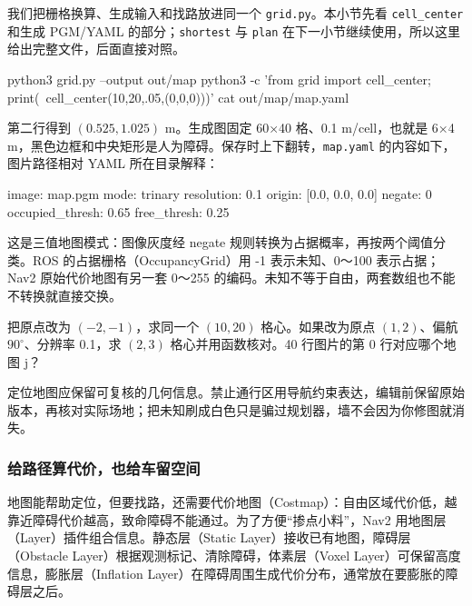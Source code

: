 \begin{example}\label{ex:nav-grid-project}
我们把栅格换算、生成输入和找路放进同一个 \texttt{grid.py}。本小节先看 \texttt{cell\_center} 和生成 PGM/YAML 的部分；\texttt{shortest} 与 \texttt{plan} 在下一小节继续使用，所以这里给出完整文件，后面直接对照。


\begin{tbash}
python3 grid.py --output out/map
python3 -c 'from grid import cell_center; print(\
cell_center(10,20,.05,(0,0,0)))'
cat out/map/map.yaml
\end{tbash}
第二行得到 $(0.525,1.025)$ m。生成图固定 60×40 格、0.1 m/cell，也就是 6×4 m，黑色边框和中央矩形是人为障碍。保存时上下翻转，\texttt{map.yaml} 的内容如下，图片路径相对 YAML 所在目录解释：
\begin{tbash}
image: map.pgm
mode: trinary
resolution: 0.1
origin: [0.0, 0.0, 0.0]
negate: 0
occupied_thresh: 0.65
free_thresh: 0.25
\end{tbash}
这是三值地图模式：图像灰度经 negate 规则转换为占据概率，再按两个阈值分类。ROS 的占据栅格（OccupancyGrid）用 -1 表示未知、0～100 表示占据；Nav2 原始代价地图有另一套 0～255 的编码。未知不等于自由，两套数组也不能不转换就直接交换。
\end{example}
\begin{exercise}\label{ex:nav-map}
把原点改为 $(-2,-1)$，求同一个 $(10,20)$ 格心。如果改为原点 $(1,2)$、偏航 $90^\circ$、分辨率 0.1，求 $(2,3)$ 格心并用函数核对。40 行图片的第 0 行对应哪个地图 j？
\end{exercise}
\begin{note}
定位地图应保留可复核的几何信息。禁止通行区用导航约束表达，编辑前保留原始版本，再核对实际场地；把未知刷成白色只是骗过规划器，墙不会因为你修图就消失。
\end{note}

\subsubsection{给路径算代价，也给车留空间}
地图能帮助定位，但要找路，还需要代价地图（Costmap）：自由区域代价低，越靠近障碍代价越高，致命障碍不能通过。为了方便“掺点小料”，Nav2 用地图层（Layer）插件组合信息。静态层（Static Layer）接收已有地图，障碍层（Obstacle Layer）根据观测标记、清除障碍，体素层（Voxel Layer）可保留高度信息，膨胀层（Inflation Layer）在障碍周围生成代价分布，通常放在要膨胀的障碍层之后。

